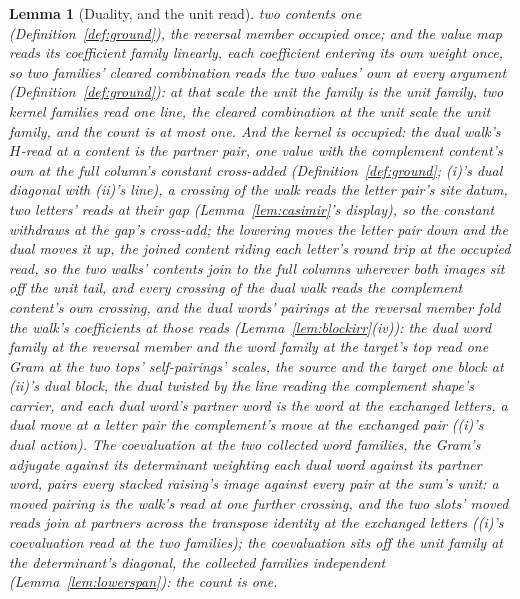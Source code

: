 \documentclass[11pt]{article}
\newtheorem{lemma}{Lemma}
\theoremstyle{definition}
\begin{document}
\begin{lemma}[Duality, and the unit read]
two contents one (Definition~\ref{def:ground}), the reversal
member occupied once; and the value map reads its coefficient
family linearly, each coefficient entering its own weight once, so
two families' cleared combination reads the two values' own at
every argument (Definition~\ref{def:ground}): at that scale the
unit the family is the unit family, two kernel families read one
line, the cleared combination at the unit scale the unit family,
and the count is at most one. And the kernel is occupied: the dual walk's $H$-read at a content is the partner
pair, one value with the complement content's own at the full
column's constant cross-added (Definition~\ref{def:ground}; (i)'s
dual diagonal with (ii)'s line), a crossing of the walk reads the
letter pair's site datum, two letters' reads at their gap
(Lemma~\ref{lem:casimir}'s display), so the constant withdraws at
the gap's cross-add; the lowering moves the letter pair down and
the dual moves it up, the joined content riding each letter's
round trip at the occupied read, so the two walks' contents join
to the full columns wherever both images sit off the unit tail,
and every crossing of the dual walk reads the complement content's
own crossing, and the dual words' pairings at
the reversal member fold the walk's coefficients at those reads
(Lemma~\ref{lem:blockirr}(iv)): the dual word family at the
reversal member and the word family at the target's top read one
Gram at the two tops' self-pairings' scales, the source and the
target one block at (ii)'s dual block, the dual twisted by the
line reading the complement shape's carrier, and each dual word's
\emph{partner word} is the word at the exchanged letters, a dual
move at a letter pair the complement's move at the exchanged pair
((i)'s dual action). The coevaluation at the two collected word
families, the Gram's adjugate against its determinant weighting
each dual word against its partner word, pairs every stacked
raising's image against every pair at the sum's unit: a moved
pairing is the walk's read at one further crossing, and the two
slots' moved reads join at partners across the transpose identity
at the exchanged letters ((i)'s coevaluation read at the two
families); the coevaluation sits off the unit family at the
determinant's diagonal, the collected families independent
(Lemma~\ref{lem:lowerspan}): the count is one.
\end{lemma}
\end{document}
